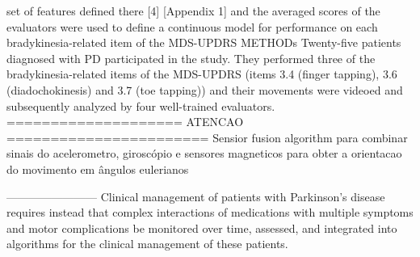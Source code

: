 set of features defined there [4] [Appendix 1] and the averaged scores of the evaluators were used to define a continuous model for performance on each bradykinesia-related item of the MDS-UPDRS
METHODs
Twenty-five patients diagnosed with PD participated in the study. They performed three of the bradykinesia-related items of the MDS-UPDRS (items 3.4 (finger tapping), 3.6 (diadochokinesis) and 3.7 (toe tapping)) and their movements were videoed and subsequently analyzed by four well-trained evaluators.
====================
ATENCAO
=======================
Sensior fusion algorithm para combinar sinais do acelerometro, giroscópio e sensores magneticos para obter a orientacao do movimento em ângulos eulerianos
~\cite{bradmonitor2015}






------------------------
Clinical management of patients with Parkinson’s disease requires instead that complex
interactions of medications with multiple symptoms and motor
complications be monitored over time, assessed, and integrated
into algorithms for the clinical management of these patients.

